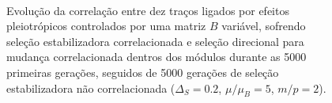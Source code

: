 \begin{center}
\begin{figure}[htbp]
  \vspace{-18pt}
  \vspace{11pt}
  \\
  \caption{Evolução da correlação entre dez traços ligados por efeitos
  pleiotrópicos controlados por uma matriz $B$ variável, sofrendo
  seleção estabilizadora correlacionada e seleção direcional para
  mudança correlacionada dentros dos módulos durante as 5000
  primeiras gerações, seguidos de 5000 gerações de seleção
  estabilizadora não correlacionada ($\Delta_S = 0.2$, $\mu/\mu_B=5$,
  $m/p=2$).}
  \label{posselecaoSemEstab}
\end{figure}
\end{center}

